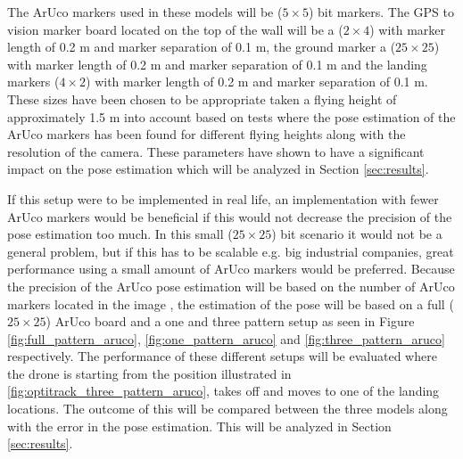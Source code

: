 \documentclass[../Head/report.tex]{subfiles}
\begin{document}
The ArUco markers used in these models will be ($5 \times 5$) bit markers. The GPS to vision marker board located on the top of the wall will be a ($2\times
4$) with marker length of 0.2 m and marker separation of 0.1 m, the ground marker a ($25\times25$) with marker length of 0.2 m and marker separation of 0.1 m and the landing markers ($4\times2$) with marker length of 0.2 m and marker separation of 0.1 m. These sizes have been chosen to be appropriate taken a flying height of approximately 1.5 m into account based on tests where the pose estimation of the ArUco markers has been found for different flying heights along with the resolution of the camera. These parameters have shown to have a significant impact on the pose estimation which will be analyzed in Section \ref{sec:results}. 

If this setup were to be implemented in real life, an implementation with fewer ArUco markers would be beneficial if this would not decrease the precision of the pose estimation too much. In this small ($25\times25$) bit scenario it would not be a general problem, but if this has to be scalable e.g. big industrial companies, great performance using a small amount of ArUco markers would be preferred.
Because the precision of the ArUco pose estimation will be based on the number of ArUco markers located in the image \cite{DetectionOfArUcoBoards}, the estimation of the pose will be based on a full ($25\times25$) ArUco board and a one and three pattern setup as seen in Figure \ref{fig:full_pattern_aruco}, \ref{fig:one_pattern_aruco} and \ref{fig:three_pattern_aruco} respectively. The performance of these different setups will be evaluated where the drone is starting from the position illustrated in \ref{fig:optitrack_three_pattern_aruco}, takes off and moves to one of the landing locations. The outcome of this will be compared between the three models along with the error in the pose estimation. This will be analyzed in Section \ref{sec:results}.      
\end{document}
